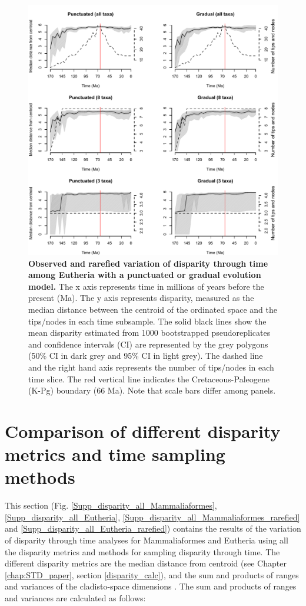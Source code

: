 \begin{figure}
\centering
    \includegraphics[keepaspectratio=true,width=1\textwidth]{Supplementaries/Figures/STD/Rarefaction-beck.pdf}
\caption[Eutheria disparity (rarefied)]{\textbf{Observed and rarefied variation of disparity through time among Eutheria with a punctuated or gradual evolution model.} The x axis represents time in millions of years before the present (Ma). The y axis represents disparity, measured as the median distance between the centroid of the ordinated space and the tips/nodes in each time subsample. The solid black lines show the mean disparity estimated from 1000 bootstrapped pseudoreplicates and confidence intervals (CI) are represented by the grey polygons (50\% CI in dark grey and 95\% CI in light grey). The dashed line and the right hand axis represents the number of tips/nodes in each time slice. The red vertical line indicates the Cretaceous-Paleogene (K-Pg) boundary (66 Ma). Note that scale bars differ among panels.}
\label{Supp_Eutheria_rarefied}
\end{figure}

\newpage
\section{Comparison of different disparity metrics and time sampling methods}
This section (Fig. \ref{Supp_disparity_all_Mammaliaformes}, \ref{Supp_disparity_all_Eutheria}, \ref{Supp_disparity_all_Mammaliaformes_rarefied} and \ref{Supp_disparity_all_Eutheria_rarefied}) contains the results of the variation of disparity through time analyses for Mammaliaformes and Eutheria using all the disparity metrics and methods for sampling disparity through time.
The different disparity metrics are the median distance from centroid (see Chapter \ref{chap:STD_paper}, section \ref{disparity_calc}), and the sum and products of ranges and variances of the cladisto-space dimensions \citep{Wills1994}.
The sum and products of ranges and variances are calculated as follows:

